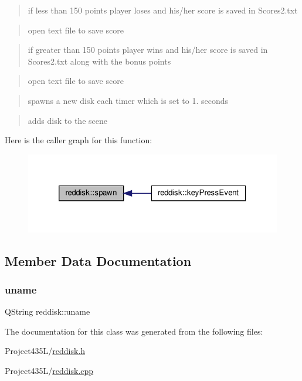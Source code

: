 \begin{quote}
if less than 150 points player loses and his/her score is saved in Scores2.\+txt \end{quote}


\begin{quote}
open text file to save score \end{quote}


\begin{quote}
if greater than 150 points player wins and his/her score is saved in Scores2.\+txt along with the bonus points \end{quote}


\begin{quote}
open text file to save score \end{quote}


\begin{quote}
spawns a new disk each timer which is set to 1. seconds \end{quote}


\begin{quote}
adds disk to the scene \end{quote}
Here is the caller graph for this function\+:
\nopagebreak
\begin{figure}[H]
\begin{center}
\leavevmode
\includegraphics[width=320pt]{classreddisk_a3afadb2c0d7b5a586aeebb613bdae3dc_icgraph}
\end{center}
\end{figure}


\subsection{Member Data Documentation}
\mbox{\label{classreddisk_a7bf6c0d696ac4e32cbe6d683c2af07b1}} 
\subsubsection{\texorpdfstring{uname}{uname}}
{\footnotesize\ttfamily Q\+String reddisk\+::uname\hspace{0.3cm}{\ttfamily [private]}}



The documentation for this class was generated from the following files\+:\begin{DoxyCompactItemize}
\item 
Project435\+L/\hyperlink{reddisk_8h}{reddisk.\+h}\item 
Project435\+L/\hyperlink{reddisk_8cpp}{reddisk.\+cpp}\end{DoxyCompactItemize}
